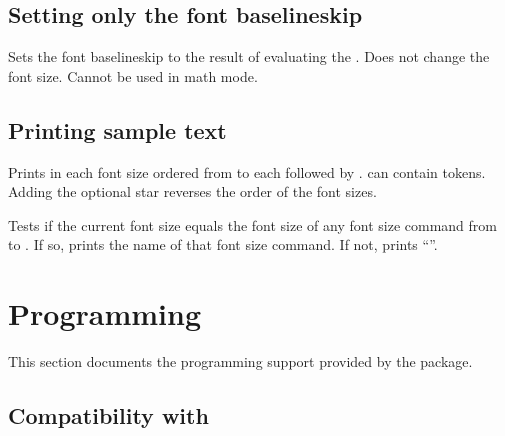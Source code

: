 \documentclass{beerydoc}
\begin{document}
\subsection{Setting only the font baselineskip}
\label{subsec:fontbaselineskip}

\begin{function}{\setfontbaselineskip}
  \begin{syntax}
     
  \end{syntax}
  Sets the font baselineskip to the result of evaluating the .
  Does not change the font size.
  Cannot be used in math mode.
\end{function}

\subsection{Printing sample text}
\label{subsec:printsampletext}

\begin{function}{\printsampletext}
  \begin{syntax}
     \sarg{} 
  \end{syntax}
  Prints  in each font size ordered from  to 
  each followed by .
   can contain  tokens.
  Adding the optional star reverses the order of the font sizes.
\end{function}

\begin{function}{\printfontsizecommand}
  \begin{syntax}
  \end{syntax}
  Tests if the current font size equals the font size of any font size command
  from  to .
  If so, prints the name of that font size command.
  If not, prints \enquote{\string\undefined}.
\end{function}


\section{Programming}
\label{sec:expl3}

This section documents the  programming support provided by the
 package.

\subsection{Compatibility with }
\label{subsec:textpurify}
\end{document}
